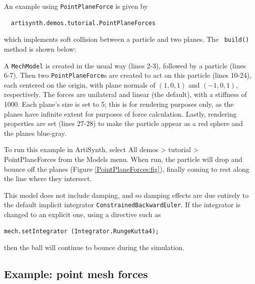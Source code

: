 An example using {\tt PointPlaneForce} is given by
%
\begin{verbatim}
  artisynth.demos.tutorial.PointPlaneForces
\end{verbatim}
%
which implements soft collision between a particle and two planes.  The {\tt
build()} method is shown below:
%
\lstset{numbers=left}
\iflatexml

\else

\fi
\lstset{numbers=none}
%
A {\tt MechModel} is created in the usual way (lines 2-3), followed by a
particle (lines 6-7). Then two {\tt PointPlaneForce}s are created to act on
this particle (lines 10-24), each centered on the origin, with plane normals of
$(1, 0, 1)$ and $(-1, 0, 1)$, respectively. The forces are unilateral and
linear (the default), with a stiffness of 1000. Each plane's size is set to 5;
this is for rendering purposes only, as the planes have infinite extent for
purposes of force calculation. Lastly, rendering properties are set (lines
27-28) to make the particle appear as a red sphere and the planes blue-gray.

To run this example in ArtiSynth, select {\sf All demos > tutorial >
PointPlaneForces} from the {\sf Models} menu. When run, the particle will drop
and bounce off the planes (Figure \ref{PointPlaneForces:fig}), finally coming
to rest along the line where they intersect.

This model does not include damping, and so damping effects are due entirely to
the default implicit integrator {\tt ConstrainedBackwardEuler}. If the
integrator is changed to an explicit one, using a directive such as
%
\begin{lstlisting}[]
  mech.setIntegrator (Integrator.RungeKutta4);
\end{lstlisting}
%
then the ball will continue to bounce during the simulation.

\subsection{Example: point mesh forces}

